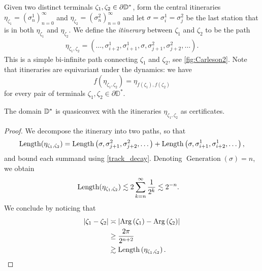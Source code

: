 
\begin{definition} \label{def-disk-itinerary} Given two distinct terminals $\zeta_{1},\zeta_{2}\in\partial\mathbb{D}^*$, form the central itineraries $\eta_{\zeta_{1}}=\left(\sigma_{n}^{1}\right)_{n=0}^{\infty}$ and 
	$\eta_{\zeta_{2}}=\left(\sigma_{n}^{2}\right)_{n=0}^{\infty}$
	 and let  $\sigma=\sigma^1_i=\sigma^2_j$ be the last station that is in both $\eta_{\zeta_{1}}$ and $\eta_{\zeta_{2}}$. %
	 We define the \emph{itinerary} between  $\zeta_{1}$ and $\zeta_{2}$ to be the path  %
 \begin{gather*}
 \eta_{\zeta_{1},\zeta_{2}}=  \left(\dots,\sigma_{i+2}^{1},\sigma_{i+1}^{1},\sigma,\sigma_{j+1}^{2},\sigma_{j+2}^{2},\dots\right).
 \end{gather*}
	This is a simple bi-infinite path connecting $\zeta_{1}$ and $\zeta_{2}$, see \cref{fig:Carleson2}. Note that itineraries are equivariant under the dynamics: we have  \begin{equation}
		f(\eta_{\zeta_1,\zeta_2})=\eta_{f(\zeta_1),f(\zeta_2)}
	\end{equation} for every pair of terminals $\zeta_1,\zeta_2 \in \partial \mathbb D^*$.
	
	
\end{definition}


\begin{theorem} \label{quasiconvex disk}
The domain $\mathbb{D}^{*}$ is quasiconvex with the itineraries $\eta_{\zeta_1,\zeta_2}$ as certificates.
\end{theorem}

\begin{proof}
We decompose the itinerary into two paths, so that
\begin{equation}
\operatorname{Length}(\eta_{\zeta_{1},\zeta_{2}})=\operatorname{Length}\left(\sigma,\sigma_{j+1}^{2},\sigma_{j+2}^{2},\dots\right)
+\operatorname{Length}\left(\sigma,\sigma_{i+1}^{1},\sigma_{i+2}^{1},\dots\right),
\end{equation}
and bound each summand using \cref{track_decay}. Denoting $\operatorname{Generation}(\sigma)=n$, we obtain
\begin{align*}
\operatorname{Length}(\eta_{\zeta_{1},\zeta_{2}})
&\lesssim 2 \sum_{k=n}^{\infty}\frac{1}{2^{k}} 
\lesssim2^{-n}. \label{eq:1}
\end{align*}
We conclude by noticing that
\begin{align*}
\left|\zeta_{1}-\zeta_{2}\right|
&\asymp
\left|\operatorname{Arg}\left(\zeta_{1}\right)-\operatorname{Arg}\left(\zeta_{2}\right)\right|\\
&\geq \frac {2\pi}{2^{n+2}}\\
&\gtrsim 	\operatorname{Length}\left(\eta_{\zeta_{1},\zeta_{2}}\right).
\end{align*}
\end{proof}

